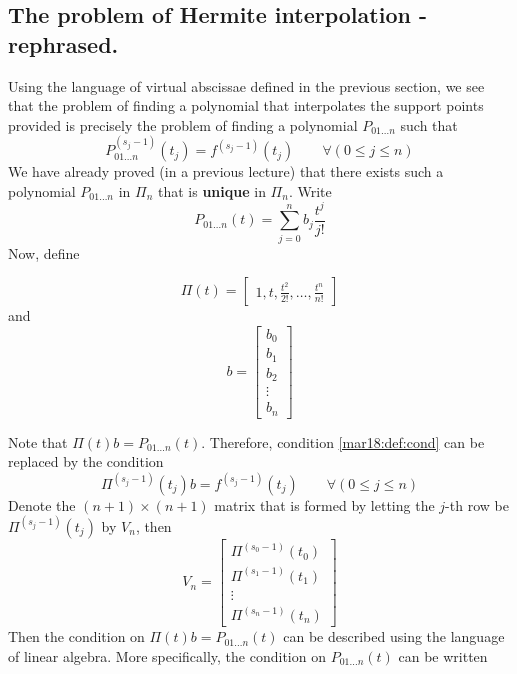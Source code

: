 \subsection{The problem of Hermite interpolation - rephrased.}

Using the language of virtual abscissae defined in the previous section, we see that the problem of finding a polynomial that interpolates the support points provided is precisely the problem of finding a polynomial $P_{01\dots n}$ such that
\begin{equation}
  \label{mar18:def:cond}
  P_{01\dots n}^{(s_j - 1)}(t_j) = f^{(s_j - 1)}(t_j) \qquad \forall(0 \leq j \leq n)
\end{equation}
We have already proved (in a previous lecture) that there exists such a polynomial $P_{01\dots n}$ in $\Pi_n$ that is \textbf{unique} in $\Pi_n$. Write
\[
  P_{01\dots n}(t) = \sum_{j = 0}^n b_j\frac{t^j}{j!}
\]
Now, define
\begin{defn}
  \[
    \Pi(t) = \begin{bmatrix}1, t, \frac{t^2}{2!}, \dots, \frac{t^n}{n!} \end{bmatrix}
  \]
  and
  \[
    b = \begin{bmatrix}b_0 \\ b_1 \\ b_2 \\ \vdots \\ b_n \end{bmatrix}
  \]
\end{defn}
Note that $\Pi(t)b = P_{01\dots n}(t)$. Therefore, condition \ref{mar18:def:cond} can be replaced by the condition
\[
  \Pi^{(s_j - 1)}(t_j)b = f^{(s_j - 1)}(t_j) \qquad \forall(0 \leq j \leq n)
\]
Denote the $(n+1) \times (n+1)$ matrix that is formed by letting the $j$-th row be $\Pi^{(s_j - 1)}(t_j)$ by $V_n$, then
\[
  V_n =
  \begin{bmatrix}
    \Pi^{(s_0 - 1)}(t_0) \\
    \Pi^{(s_1 - 1)}(t_1) \\
    \vdots \\
    \Pi^{(s_n - 1)}(t_n)
  \end{bmatrix}
\]
Then the condition on $\Pi(t)b = P_{01\dots n}(t)$ can be described using the language of linear algebra. More specifically, the condition on $P_{01\dots n}(t)$ can be written
